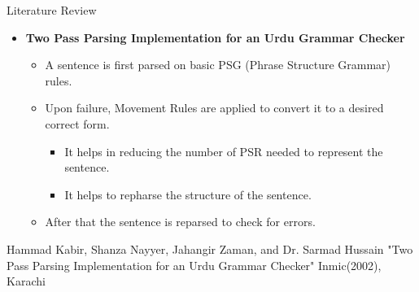 \documentclass{beamer}
\begin{document}
\begin{frame}{Literature Review}
\begin{itemize}
	\vspace{0.5em}
	\item \textbf{Two Pass Parsing Implementation for an Urdu Grammar Checker} \\
	\vspace{1em}
	\begin{itemize}
		\item A sentence is first parsed on basic PSG (Phrase Structure Grammar) rules.  \\
		\vspace{0.5em}
		\item Upon failure, Movement Rules are applied to convert it to a desired correct form. \\ 
		\begin{itemize}
			\item It helps in reducing the number of PSR needed to represent the sentence.
			\item It helps to repharse the structure of the sentence.
		\end{itemize}
		\vspace{0.5em}
		\item After that the sentence is reparsed to check for errors.\\
		\vspace{2em}	
	\end{itemize}
\end{itemize}

	\scriptsize \color{blue}Hammad Kabir, Shanza Nayyer, Jahangir Zaman, and Dr. Sarmad Hussain
	\color{black} {"Two Pass Parsing Implementation for an Urdu Grammar Checker"} 
	\color{blue} Inmic(2002), Karachi

\end{frame}


\end{document}
